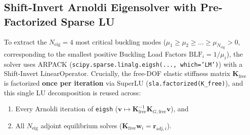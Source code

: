 \documentclass[11pt, a4paper]{article}
\begin{document}
\subsection{Shift-Invert Arnoldi Eigensolver with Pre-Factorized Sparse LU}
To extract the $N_{\text{eig}} = 4$ most critical buckling modes ($\mu_1 \ge \mu_2 \ge \dots \ge \mu_{N_{\text{eig}}} > 0$, corresponding to the smallest positive Buckling Load Factors $\text{BLF}_i = 1/\mu_i$), the solver uses ARPACK (\texttt{scipy.sparse.linalg.eigsh(..., which='LM')}) with a Shift-Invert LinearOperator. Crucially, the free-DOF elastic stiffness matrix $\mathbf{K}_{\text{free}}$ is factorized \textbf{once per iteration} via SuperLU (\texttt{sla.factorized(K\_free)}), and this single LU decomposition is reused across:
\begin{enumerate}
    \item Every Arnoldi iteration of \texttt{eigsh} ($\mathbf{v} \mapsto \mathbf{K}_{\text{free}}^{-1} \mathbf{K}_{G,\text{free}} \mathbf{v}$), and
    \item All $N_{\text{eig}}$ adjoint equilibrium solves ($\mathbf{K}_{\text{free}} \mathbf{w}_i = \mathbf{r}_{\text{adj}, i}$).
\end{enumerate}
\end{document}
